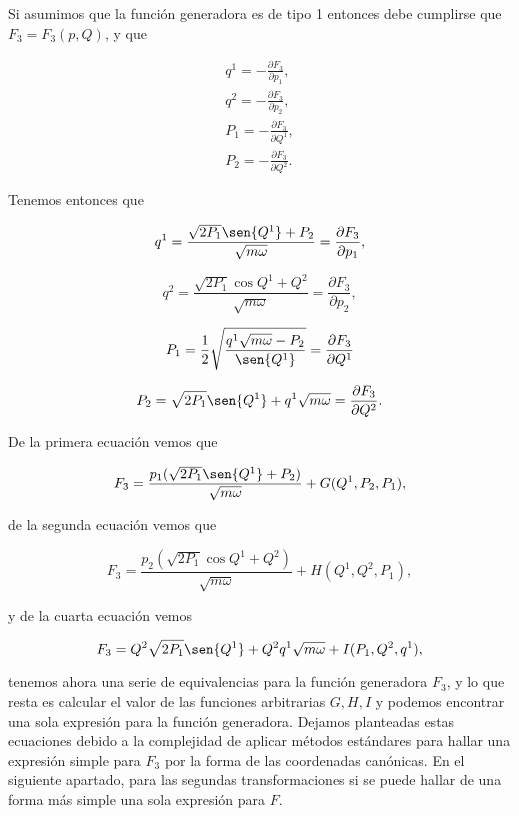 \documentclass[a4paper,10pt]{article}
\numberwithin{equation}{section}
\begin{document}
Si asumimos que la función generadora es de tipo 1 entonces debe cumplirse que 
$F_3 = F_3(p,Q)$, y que 

\begin{align*}
 q^1 = - \frac{\partial F_3}{\partial p_1}, \\
 q^2 = - \frac{\partial F_3}{\partial p_2}, \\
 P_1 = - \frac{\partial F_3}{\partial Q^1}, \\
 P_2 = - \frac{\partial F_3}{\partial Q^2}.
\end{align*}

Tenemos entonces que 

\begin{equation}
 q^1 = \frac{\sqrt{2P_1}\sen{Q^1}+P_2}{\sqrt{m\omega}} = 
 \frac{\partial F_3}{\partial p_1},
\end{equation}

\begin{equation}
 q^2 = \frac{\sqrt{2P_1}\cos{Q^1}+Q^2}{\sqrt{m\omega}}  = 
 \frac{\partial F_3}{\partial p_2},
\end{equation}

\begin{equation}
 P_1 = \frac{1}{2}\sqrt{\frac{q^1\sqrt{m\omega}-P_2}{\sen{Q^1}}} = 
 \frac{\partial F_3}{\partial Q^1}
\end{equation}

\begin{equation}
 P_2 = \sqrt{2P_1}\sen{Q^1} + q^1\sqrt{m\omega} = 
 \frac{\partial F_3}{\partial Q^2}.
\end{equation}

De la primera ecuación vemos que 

\begin{equation}
 F_3 = \frac{p_1(\sqrt{2P_1}\sen{Q^1}+P_2)}{\sqrt{m\omega}} + G(Q^1,P_2,P_1),
\end{equation}

de la segunda ecuación vemos que 

\begin{equation}
 F_3 = \frac{p_2(\sqrt{2P_1}\cos{Q^1}+Q^2)}{\sqrt{m\omega}} + H(Q^1,Q^2,P_1),
\end{equation}

y de la cuarta ecuación vemos 

\begin{equation}
 F_3 =  Q^2\sqrt{2P_1}\sen{Q^1} + Q^2q^1\sqrt{m\omega} + I(P_1,Q^2,q^1),
\end{equation}

tenemos ahora una serie de equivalencias para la función generadora $F_3$, y lo que 
resta es calcular el valor de las funciones arbitrarias $G,H,I$ y podemos encontrar 
una sola expresión para la función generadora. Dejamos planteadas estas ecuaciones 
debido a la complejidad de aplicar métodos estándares para hallar una expresión 
simple para $F_3$ por la forma de las coordenadas canónicas. En el siguiente apartado, 
para las segundas transformaciones si se puede hallar de una forma más simple una 
sola expresión para $F$.
\end{document}
